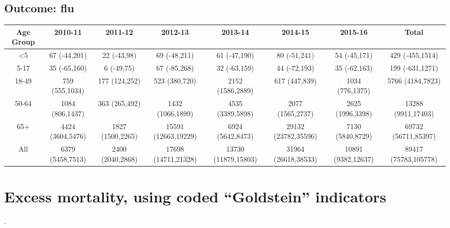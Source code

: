 \documentclass[landscape]{article}\usepackage[]{graphicx}\usepackage[]{color}
\begin{document}
\subsection{Outcome: flu}
\begin{table}[ht]
\begin{tabular}{cccccccc}
Age Group & 2010-11 & 2011-12 & 2012-13 & 2013-14 & 2014-15 & 2015-16 & Total\\
\hline
<5 & 67 (-44,201) & 22 (-43,98) & 69 (-48,211) & 61 (-47,190) & 80 (-51,241) & 54 (-45,171) & 429 (-455,1514) \\
5-17 & 35 (-65,160) & 6 (-49,75) & 67 (-85,268) & 32 (-63,159) & 44 (-72,193) & 35 (-62,163) & 199 (-631,1271) \\
18-49 & 759 (555,1034) & 177 (124,252) & 523 (380,720) & 2152 (1586,2889) & 617 (447,839) & 1034 (776,1375) & 5766 (4184,7823) \\
50-64 & 1084 (806,1437) & 363 (265,492) & 1432 (1066,1899) & 4535 (3389,5898) & 2077 (1565,2737) & 2625 (1996,3398) & 13288 (9911,17403) \\
65+ & 4424 (3604,5476) & 1827 (1500,2265) & 15591 (12663,19229) & 6924 (5642,8473) & 29132 (23782,35596) & 7130 (5840,8729) & 69732 (56711,85397) \\
All & 6379 (5458,7513) & 2400 (2040,2868) & 17698 (14711,21328) & 13730 (11879,15803) & 31964 (26618,38533) & 10891 (9382,12637) & 89417 (75783,105778) \\

\hline
\end{tabular}
\end{table}
%
\clearpage
\section{Excess mortality, using coded ``Goldstein'' indicators}
.
\end{document}
